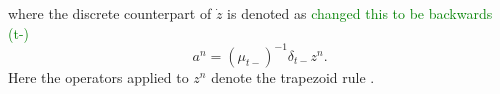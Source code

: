 \documentclass[twoside,a4paper,dvipsnames]{article}
\def\SBcomment[#1]{\textcolor{Red}{#1}}
\def\SWcomment[#1]{\textcolor{Green}{#1}}
\begin{document}
where the discrete counterpart of $\dot{z}$ is denoted as \SWcomment[changed this to be backwards (t-)]{}
\begin{equation}\label{eq:an}
    a^n = (\mu_{t-})^{-1}\delta_{t-} z^n.
\end{equation}
Here the operators applied to $z^n$ denote the trapezoid rule \cite{Bilbao2009}.

\end{document}
